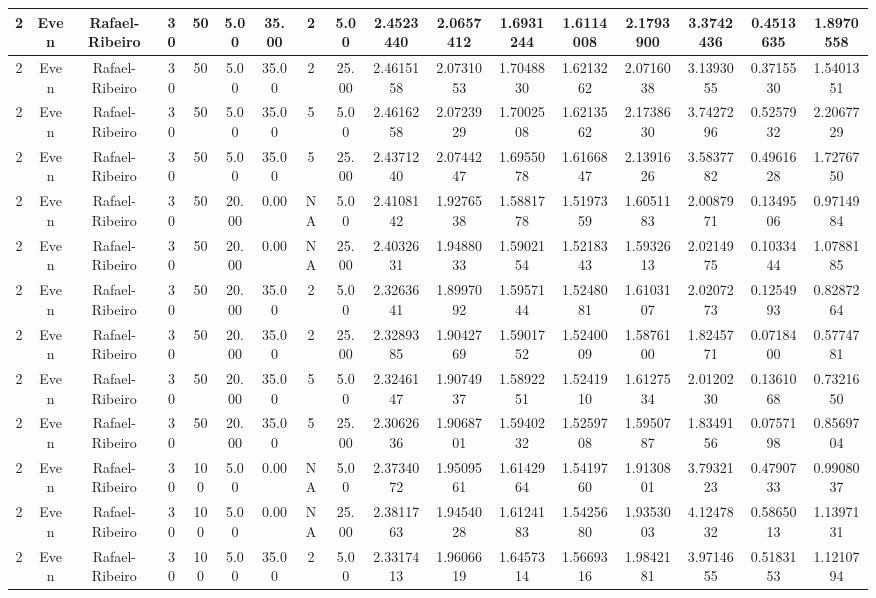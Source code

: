 \begin{longtable}{ | c | c | c | c | c | c | c | c | c | c | c | c | c | c | c | c | c | }
	\hline
	2	&	Even	&	Rafael-Ribeiro	&	30	&	50	&	5.00	&	35.00	&	2	&	5.00	&	2.4523440	&	2.0657412	&	1.6931244	&	1.6114008	&	2.1793900	&	3.3742436	&	0.4513635	&	1.8970558 \\
	\hline
	2	&	Even	&	Rafael-Ribeiro	&	30	&	50	&	5.00	&	35.00	&	2	&	25.00	&	2.4615158	&	2.0731053	&	1.7048830	&	1.6213262	&	2.0716038	&	3.1393055	&	0.3715530	&	1.5401351 \\
	\hline
	2	&	Even	&	Rafael-Ribeiro	&	30	&	50	&	5.00	&	35.00	&	5	&	5.00	&	2.4616258	&	2.0723929	&	1.7002508	&	1.6213562	&	2.1738630	&	3.7427296	&	0.5257932	&	2.2067729 \\
	\hline
	2	&	Even	&	Rafael-Ribeiro	&	30	&	50	&	5.00	&	35.00	&	5	&	25.00	&	2.4371240	&	2.0744247	&	1.6955078	&	1.6166847	&	2.1391626	&	3.5837782	&	0.4961628	&	1.7276750 \\
	\hline
	2	&	Even	&	Rafael-Ribeiro	&	30	&	50	&	20.00	&	0.00	&	NA	&	5.00	&	2.4108142	&	1.9276538	&	1.5881778	&	1.5197359	&	1.6051183	&	2.0087971	&	0.1349506	&	0.9714984 \\
	\hline
	2	&	Even	&	Rafael-Ribeiro	&	30	&	50	&	20.00	&	0.00	&	NA	&	25.00	&	2.4032631	&	1.9488033	&	1.5902154	&	1.5218343	&	1.5932613	&	2.0214975	&	0.1033444	&	1.0788185 \\
	\hline
	2	&	Even	&	Rafael-Ribeiro	&	30	&	50	&	20.00	&	35.00	&	2	&	5.00	&	2.3263641	&	1.8997092	&	1.5957144	&	1.5248081	&	1.6103107	&	2.0207273	&	0.1254993	&	0.8287264 \\
	\hline
	2	&	Even	&	Rafael-Ribeiro	&	30	&	50	&	20.00	&	35.00	&	2	&	25.00	&	2.3289385	&	1.9042769	&	1.5901752	&	1.5240009	&	1.5876100	&	1.8245771	&	0.0718400	&	0.5774781 \\
	\hline
	2	&	Even	&	Rafael-Ribeiro	&	30	&	50	&	20.00	&	35.00	&	5	&	5.00	&	2.3246147	&	1.9074937	&	1.5892251	&	1.5241910	&	1.6127534	&	2.0120230	&	0.1361068	&	0.7321650 \\
	\hline
	2	&	Even	&	Rafael-Ribeiro	&	30	&	50	&	20.00	&	35.00	&	5	&	25.00	&	2.3062636	&	1.9068701	&	1.5940232	&	1.5259708	&	1.5950787	&	1.8349156	&	0.0757198	&	0.8569704 \\
	\hline
	2	&	Even	&	Rafael-Ribeiro	&	30	&	100	&	5.00	&	0.00	&	NA	&	5.00	&	2.3734072	&	1.9509561	&	1.6142964	&	1.5419760	&	1.9130801	&	3.7932123	&	0.4790733	&	0.9908037 \\
	\hline
	2	&	Even	&	Rafael-Ribeiro	&	30	&	100	&	5.00	&	0.00	&	NA	&	25.00	&	2.3811763	&	1.9454028	&	1.6124183	&	1.5425680	&	1.9353003	&	4.1247832	&	0.5865013	&	1.1397131 \\
	\hline
	2	&	Even	&	Rafael-Ribeiro	&	30	&	100	&	5.00	&	35.00	&	2	&	5.00	&	2.3317413	&	1.9606619	&	1.6457314	&	1.5669316	&	1.9842181	&	3.9714655	&	0.5183153	&	1.1210794 \\

\end{longtable}
